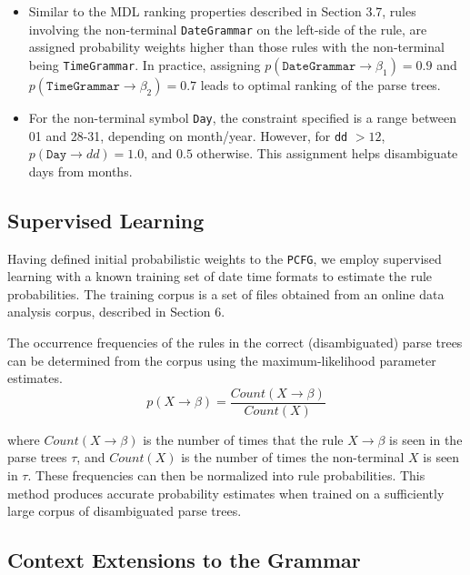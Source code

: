 \begin{itemize}
\item Similar to the MDL ranking properties described in Section 3.7, rules involving the non-terminal \texttt{DateGrammar} on the left-side of the rule, are assigned probability weights higher than those rules with the non-terminal being \texttt{TimeGrammar}. In practice, assigning $p(\texttt{DateGrammar} \rightarrow \beta_{1}) = 0.9$ and $p(\texttt{TimeGrammar} \rightarrow \beta_{2}) = 0.7$ leads to optimal ranking of the parse trees.

\item For the non-terminal symbol \texttt{Day}, the constraint specified is a range between 01 and 28-31, depending on month/year. However, for \texttt{dd} $> 12$, $p(\texttt{Day} \rightarrow d d) = 1.0$, and $0.5$ otherwise. This assignment helps disambiguate days from months.




\end{itemize}

\subsection{Supervised Learning}

Having defined initial probabilistic weights to the \texttt{PCFG}, we employ supervised learning with a known training set of date time formats to estimate the rule probabilities.  The training corpus is a set of files obtained from an online data analysis corpus, described in Section 6.

The occurrence frequencies of the rules in the correct
(disambiguated) parse trees can be determined from the corpus using the maximum-likelihood parameter estimates.
\begin{equation}
p(X \rightarrow \beta) = \frac{Count(X \rightarrow \beta)}{Count(X)}
\end{equation}

where $Count(X \rightarrow \beta)$ is the number of times that the rule $X \rightarrow \beta$ is seen in
the parse trees $\tau$, and $Count(X)$ is the number of times the non-terminal $X$ is seen in $\tau$. These frequencies can then be normalized into rule probabilities. This method produces accurate probability estimates when trained on a sufficiently large corpus of disambiguated parse trees. 

\subsection{Context Extensions to the Grammar}

